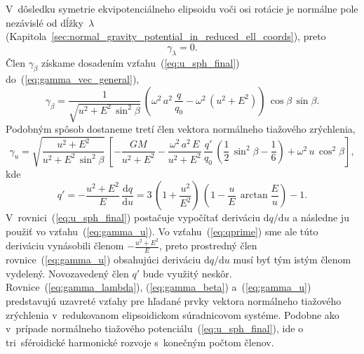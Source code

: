 \documentclass[a4paper,12pt]{book}
\newcommand{\diff}{\mathrm d}
\begin{document}
V~dôsledku symetrie ekvipotenciálneho elipsoidu voči osi rotácie je normálne 
pole nezávislé od dĺžky~$\lambda$ 
(Kapitola~\ref{sec:normal_gravity_potential_in_reduced_ell_coords}), preto
%
\begin{equation}
\label{eq:gamma_lambda}
\gamma_\lambda = 0{.}
\end{equation}
%
Člen $\gamma_\beta$ získame dosadením vzťahu~(\ref{eq:u_sph_final}) 
do~(\ref{eq:gamma_vec_general}),
%
\begin{equation}
\label{eq:gamma_beta}
\gamma_\beta = \frac{1}{\sqrt{u^2 + E^2 \, \sin^2\beta}} \, \left( \omega^2 \, 
a^2 \, \frac{q}{q_0} - \omega^2 \, (u^2 + E^2) \right) \, \cos\beta \, 
\sin\beta{.}
\end{equation}
%
Podobným spôsob dostaneme tretí člen vektora normálneho tiažového zrýchlenia,
%
\begin{equation}
\label{eq:gamma_u}
\gamma_u = \sqrt{\dfrac{u^2 + E^2}{u^2 + E^2 \, \sin^2\beta}} \, \left[ 
-\frac{GM}{u^2 + E^2} - \frac{\omega^2 \, a^2 \, E}{u^2 + E^2} \, 
\frac{q'}{q_0} \, \left( \frac{1}{2} \, \sin^2\beta - \frac{1}{6} \right) 
+ \omega^2 \, u \, \cos^2\beta \right]{,}
\end{equation}
%
kde \parencite{MoritzPhysicalGeodesy}
%
\begin{equation}
\label{eq:qprime}
q' = -\frac{u^2 + E^2}{E} \, \frac{\diff q}{\diff u} = 3 \, \left( 
1 + \frac{u^2}{E^2} \right) \, \left(  1 - \frac{u}{E} \, \arctan\frac{E}{u} 
\right) - 1{.}
\end{equation}
%
V~rovnici~(\ref{eq:u_sph_final}) postačuje vypočítať deriváciu $\diff q \slash 
\diff u$ a následne ju použiť vo vzťahu~(\ref{eq:gamma_u}).  Vo 
vzťahu~(\ref{eq:qprime}) sme ale túto deriváciu vynásobili členom $-\frac{u^2 
+ E^2}{E}$, preto prostredný člen rovnice~(\ref{eq:gamma_u}) obsahujúci 
deriváciu $\diff q \slash \diff u$ musí byť tým istým členom vydelený.  
Novozavedený člen $q'$ bude využitý neskôr.  Rovnice~(\ref{eq:gamma_lambda}), 
(\ref{eq:gamma_beta}) a~(\ref{eq:gamma_u}) predstavujú uzavreté vzťahy pre 
hľadané prvky vektora normálneho tiažového zrýchlenia v~redukovanom 
elipsoidickom súradnicovom systéme.  Podobne ako v~prípade normálneho tiažového 
potenciálu~(\ref{eq:u_sph_final}), ide o tri~sféroidické harmonické rozvoje 
s~konečným počtom členov.
\end{document}
